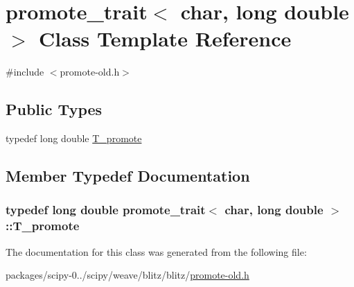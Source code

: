 \hypertarget{classpromote__trait_3_01char_00_01long_01double_01_4}{}\section{promote\+\_\+trait$<$ char, long double $>$ Class Template Reference}
\label{classpromote__trait_3_01char_00_01long_01double_01_4}


{\ttfamily \#include $<$promote-\/old.\+h$>$}

\subsection*{Public Types}
\begin{DoxyCompactItemize}
\item 
typedef long double \hyperlink{classpromote__trait_3_01char_00_01long_01double_01_4_a42af072eee50db2e4e70b52f633b118c}{T\+\_\+promote}
\end{DoxyCompactItemize}


\subsection{Member Typedef Documentation}
\hypertarget{classpromote__trait_3_01char_00_01long_01double_01_4_a42af072eee50db2e4e70b52f633b118c}{}
\subsubsection[{T\+\_\+promote}]{\setlength{\rightskip}{0pt plus 5cm}typedef long double {\bf promote\+\_\+trait}$<$ char, long double $>$\+::{\bf T\+\_\+promote}}\label{classpromote__trait_3_01char_00_01long_01double_01_4_a42af072eee50db2e4e70b52f633b118c}


The documentation for this class was generated from the following file\+:\begin{DoxyCompactItemize}
\item 
packages/scipy-\/0../scipy/weave/blitz/blitz/\hyperlink{promote-old_8h}{promote-\/old.\+h}\end{DoxyCompactItemize}
